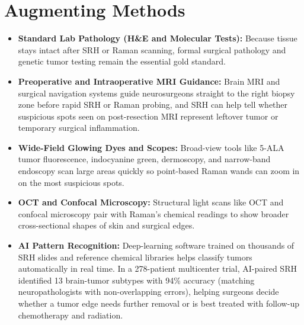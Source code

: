 \section{Augmenting Methods}
\begin{itemize}
  \item \textbf{Standard Lab Pathology (H\&E and Molecular Tests):} Because tissue stays intact after SRH or Raman scanning, formal surgical pathology and genetic tumor testing remain the essential gold standard.
  \item \textbf{Preoperative and Intraoperative MRI Guidance:} Brain MRI and surgical navigation systems guide neurosurgeons straight to the right biopsy zone before rapid SRH or Raman probing, and SRH can help tell whether suspicious spots seen on post-resection MRI represent leftover tumor or temporary surgical inflammation.
  \item \textbf{Wide-Field Glowing Dyes and Scopes:} Broad-view tools like 5-ALA tumor fluorescence, indocyanine green, dermoscopy, and narrow-band endoscopy scan large areas quickly so point-based Raman wands can zoom in on the most suspicious spots.
  \item \textbf{OCT and Confocal Microscopy:} Structural light scans like OCT and confocal microscopy pair with Raman's chemical readings to show broader cross-sectional shapes of skin and surgical edges.
  \item \textbf{AI Pattern Recognition:} Deep-learning software trained on thousands of SRH slides and reference chemical libraries helps classify tumors automatically in real time. In a 278-patient multicenter trial, AI-paired SRH identified 13 brain-tumor subtypes with 94\% accuracy (matching neuropathologists with non-overlapping errors), helping surgeons decide whether a tumor edge needs further removal or is best treated with follow-up chemotherapy and radiation.
\end{itemize}

